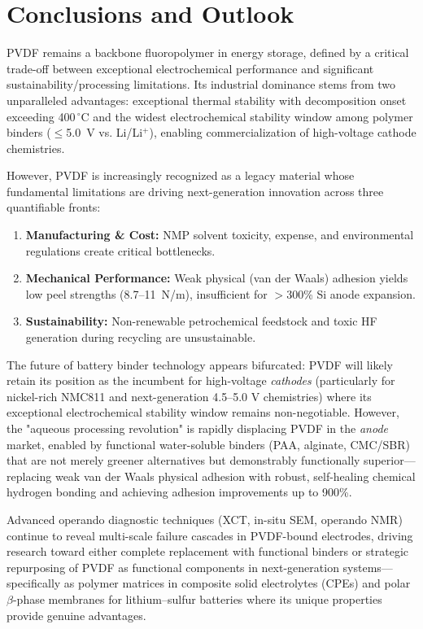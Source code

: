 \documentclass[12pt,a4paper]{article}
\begin{document}
\section*{Conclusions and Outlook}
\noindent PVDF remains a backbone fluoropolymer in energy storage, defined by a critical trade-off between exceptional electrochemical performance and significant sustainability/processing limitations. Its industrial dominance stems from two unparalleled advantages: exceptional thermal stability with decomposition onset exceeding 400\,$^{\circ}$C and the widest electrochemical stability window among polymer binders ($\leq$5.0~V vs. Li/Li$^+$), enabling commercialization of high-voltage cathode chemistries.\citep{ref39,ref40,ref47,ref48}

However, PVDF is increasingly recognized as a legacy material whose fundamental limitations are driving next-generation innovation across three quantifiable fronts:\citep{ref43,ref46,ref48}

\begin{enumerate}
  \item \textbf{Manufacturing \& Cost:} NMP solvent toxicity, expense, and environmental regulations create critical bottlenecks.
  \item \textbf{Mechanical Performance:} Weak physical (van der Waals) adhesion yields low peel strengths (8.7--11~N/m), insufficient for $>$300\% Si anode expansion.
  \item \textbf{Sustainability:} Non-renewable petrochemical feedstock and toxic HF generation during recycling are unsustainable.
\end{enumerate}

The future of battery binder technology appears bifurcated: PVDF will likely retain its position as the incumbent for high-voltage \textit{cathodes} (particularly for nickel-rich NMC811 and next-generation 4.5--5.0 V chemistries) where its exceptional electrochemical stability window remains non-negotiable. However, the "aqueous processing revolution" is rapidly displacing PVDF in the \textit{anode} market, enabled by functional water-soluble binders (PAA, alginate, CMC/SBR) that are not merely greener alternatives but demonstrably functionally superior—replacing weak van der Waals physical adhesion with robust, self-healing chemical hydrogen bonding and achieving adhesion improvements up to 900\%.\citep{ref18,ref43,ref44,ref45,ref49}

Advanced operando diagnostic techniques (XCT, in-situ SEM, operando NMR) continue to reveal multi-scale failure cascades in PVDF-bound electrodes, driving research toward either complete replacement with functional binders or strategic repurposing of PVDF as functional components in next-generation systems—specifically as polymer matrices in composite solid electrolytes (CPEs) and polar $\beta$-phase membranes for lithium--sulfur batteries where its unique properties provide genuine advantages.\citep{ref14,ref16,ref19,ref23,ref27,ref30}
\end{document}
